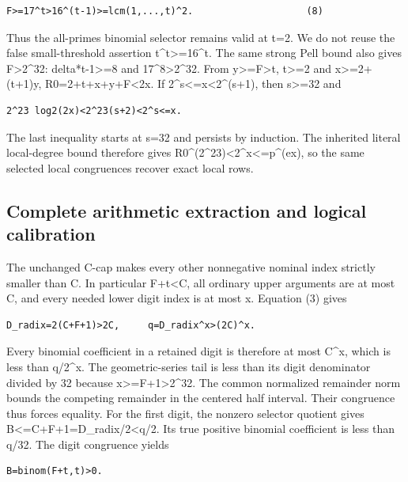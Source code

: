 \begin{verbatim}
F>=17^t>16^(t-1)>=lcm(1,...,t)^2.                    (8)
\end{verbatim}

Thus the all-primes binomial selector remains valid at t=2. We do not
reuse the false small-threshold assertion t\^{}t\textgreater=16\^{}t.
The same strong Pell bound also gives F\textgreater2\^{}32:
delta*t-1\textgreater=8 and 17\^{}8\textgreater2\^{}32. From
y\textgreater=F\textgreater t, t\textgreater=2 and
x\textgreater=2+(t+1)y, R0=2+t+x+y+F\textless2x. If
2\^{}s\textless=x\textless2\^{}(s+1), then s\textgreater=32 and

\begin{verbatim}
2^23 log2(2x)<2^23(s+2)<2^s<=x.
\end{verbatim}

The last inequality starts at s=32 and persists by induction. The
inherited literal local-degree bound therefore gives
R0\^{}(2\^{}23)\textless2\^{}x\textless=p\^{}(ex), so the same selected
local congruences recover exact local rows.

\subsection{Complete arithmetic extraction and logical
calibration}\label{complete-arithmetic-extraction-and-logical-calibration}

The unchanged C-cap makes every other nonnegative nominal index strictly
smaller than C. In particular F+t\textless C, all ordinary upper
arguments are at most C, and every needed lower digit index is at most
x. Equation (3) gives

\begin{verbatim}
D_radix=2(C+F+1)>2C,     q=D_radix^x>(2C)^x.
\end{verbatim}

Every binomial coefficient in a retained digit is therefore at most
C\^{}x, which is less than q/2\^{}x. The geometric-series tail is less
than its digit denominator divided by 32 because
x\textgreater=F+1\textgreater2\^{}32. The common normalized remainder
norm bounds the competing remainder in the centered half interval. Their
congruence thus forces equality. For the first digit, the nonzero
selector quotient gives
\textbar B\textbar\textless=C+F+1=D\_radix/2\textless q/2. Its true
positive binomial coefficient is less than q/32. The digit congruence
yields

\begin{verbatim}
B=binom(F+t,t)>0.
\end{verbatim}

